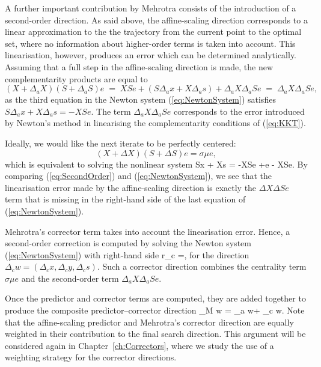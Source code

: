 A further important contribution by Mehrotra consists of the 
introduction of a second-order direction. 
As said above, the affine-scaling direction 
corresponds to a linear approximation to the the trajectory from 
the current point to the optimal set, where no information about 
higher-order terms is taken into account. This linearisation, 
however, produces an error which can be determined analytically.
%
Assuming that a full step in the affine-scaling direction is made, 
the new complementarity products are equal to
\[
  (X + \Delta_a X) (S + \Delta_a S) e 
   \;=\; XSe + (S \Delta_a x + X \Delta_a s) + \Delta_a X \Delta_a S e
   \;=\; \Delta_a X \Delta_a S e,
\]
as the third equation in the Newton system (\ref{eq:NewtonSystem}) satisfies 
$S \Delta_a x + X \Delta_a s = -XSe.$
%
The term $\Delta_a X \Delta_a S e$ corresponds to the error introduced
by Newton's method in linearising the complementarity conditions of 
(\ref{eq:KKT}).

Ideally, we would like the next iterate to be perfectly centered: 
\[
  (X+\Delta X)(S+\Delta S)e = \sigma\mu e,
\]
which is equivalent to solving the nonlinear system
\be  \label{eq:SecondOrder}
  S\Delta x + X\Delta s = -XSe +\sigma\mu e - \Delta X\Delta Se.
\ee
By comparing (\ref{eq:SecondOrder}) and (\ref{eq:NewtonSystem}),
we see that 
the linearisation error made by the affine-scaling direction is exactly 
the $\Delta X\Delta Se$ term that is missing in the right-hand side
of the last equation of (\ref{eq:NewtonSystem}).

Mehrotra's corrector term takes into account the linearisation error.
Hence, a second-order correction is computed by solving the Newton system 
(\ref{eq:NewtonSystem}) with right-hand side
\be \label{eq:MehrotraRhs}
r_c =,
\ee
for the direction $\Delta_c w = (\Delta_c x,\Delta_c y,\Delta_c s)$.
Such a corrector direction combines the centrality term $\sigma \mu e$
and the second-order term $\Delta_a X\Delta_a Se$.

Once the predictor and corrector terms are computed, they are 
added together to produce the composite predictor--corrector direction
\be \label{eq:CompositeDirection}
\Delta_M w = \Delta_a w+ \Delta_c w.
\ee
Note that the affine-scaling predictor and Mehrotra's corrector direction 
are equally weighted in their contribution to the final search direction. 
This argument will be considered again in Chapter~\ref{ch:Correctors}, 
where we study the use of a weighting strategy for the corrector
directions.

